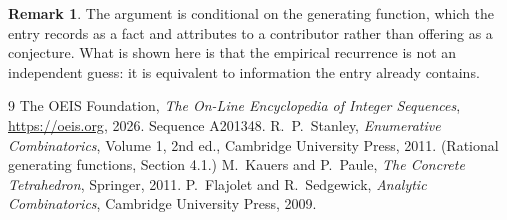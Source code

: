 \documentclass[11pt,a4paper]{article}
\theoremstyle{plain}
\theoremstyle{definition}
\newtheorem{remark}[theorem]{Remark}
\begin{document}
\begin{remark}
The argument is conditional on the generating function, which the entry records as a fact and
attributes to a contributor rather than offering as a conjecture. What is shown here is that
the empirical recurrence is not an independent guess: it is equivalent to information the
entry already contains.
\end{remark}

\begin{thebibliography}{9}
 The OEIS Foundation, \emph{The On-Line Encyclopedia of Integer
Sequences}, \url{https://oeis.org}, 2026. Sequence A201348.
 R.~P.~Stanley, \emph{Enumerative Combinatorics}, Volume 1, 2nd ed.,
Cambridge University Press, 2011. (Rational generating functions, Section 4.1.)
 M.~Kauers and P.~Paule, \emph{The Concrete Tetrahedron}, Springer, 2011.
 P.~Flajolet and R.~Sedgewick, \emph{Analytic Combinatorics}, Cambridge
University Press, 2009.
\end{thebibliography}
\end{document}
